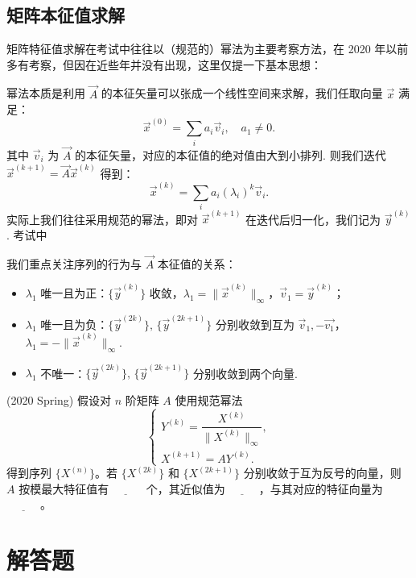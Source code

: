\subsection*{矩阵本征值求解}
矩阵特征值求解在考试中往往以（规范的）幂法为主要考察方法，在 2020 年以前多有考察，但因在近些年并没有出现，这里仅提一下基本思想：

幂法本质是利用 $\vec{A}$ 的本征矢量可以张成一个线性空间来求解，我们任取向量 $\vec{x}$ 满足：
\[
    \vec{x}^{(0)} = \sum_i a_i \vec{v}_i,\quad a_1\neq 0.
\]
其中 $\vec{v}_i$ 为 $\vec{A}$ 的本征矢量，对应的本征值的绝对值由大到小排列. 则我们迭代 $\vec{x}^{(k+1)} = \vec{A}\vec{x}^{(k)}$ 得到：
\[
    \vec{x}^{(k)}= \sum_i a_i(\lambda_i)^k \vec{v}_i.
\]
实际上我们往往采用规范的幂法，即对 $\vec{x} ^{(k+1)}$ 在迭代后归一化，我们记为 $\vec{y}^{(k)}$. 考试中{\color{red} 我们重点关注序列的行为与 $\vec{A}$ 本征值的关系：
\begin{itemize}
    \item $\lambda_1$ 唯一且为正：$\{\vec{y}^{(k)}\}$ 收敛，$\lambda_1 = \|\vec{x}^{(k)}\|_\infty$，$\vec{v}_1 = \vec{y}^{(k)}$；
    \item $\lambda_1$ 唯一且为负：$\{\vec{y}^{(2k)}\},\, \{\vec{y}^{(2k+1)}\}$ 分别收敛到互为 $\vec{v}_1,-\vec{v_1}$，$\lambda_1 = - \| \vec{x}^{(k)}\|_\infty$.
    \item $\lambda_1$ 不唯一：$\{\vec{y}^{(2k)}\},\, \{\vec{y}^{(2k+1)}\}$ 分别收敛到两个向量.
\end{itemize}}
\begin{problembox}
    \begin{example}
        (2020 Spring) 假设对 $n$ 阶矩阵 $A$ 使用规范幂法
    \[
    \begin{cases}
        Y^{(k)} = \dfrac{X^{(k)}}{ \| X^{(k)} \|_\infty}, \\ 
        X^{(k+1)} = AY^{(k)}.
    \end{cases}
    \]
    得到序列 $\{X^{(n)}\}$。若 $\{X^{(2k)}\}$ 和 $\{X^{(2k+1)}\}$ 分别收敛于互为反号的向量，则 $A$ 按模最大特征值有$\underline{\quad \quad \quad }$ 个，其近似值为$\underline{\quad \quad \quad }$，与其对应的特征向量为$\underline{\quad \quad \quad }$。
    \end{example}
    \begin{solution}
        
    \end{solution}
\end{problembox}




\section*{解答题}

